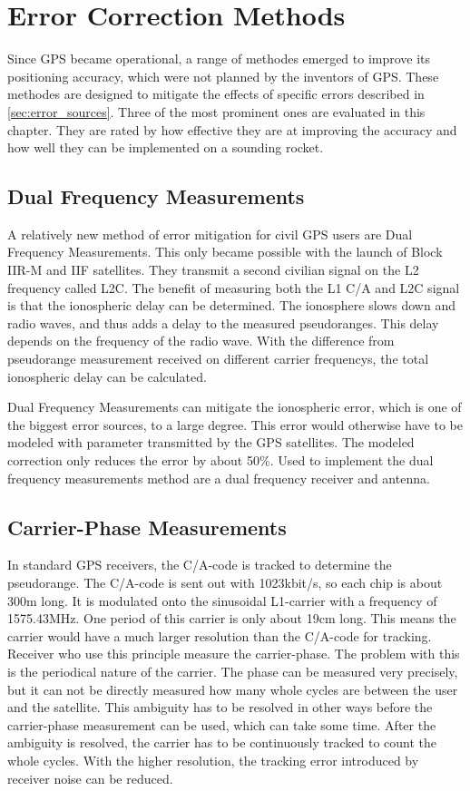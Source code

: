 \chapter{Error Correction Methods}

Since GPS became operational, a range of methodes emerged to improve its positioning accuracy, which were not planned by the inventors of GPS.
These methodes are designed to mitigate the effects of specific errors described in \ref{sec:error_sources}.
Three of the most prominent ones are evaluated in this chapter.
They are rated by how effective they are at improving the accuracy and how well they can be implemented on a sounding rocket.


\section{Dual Frequency Measurements}

A relatively new method of error mitigation for civil GPS users are Dual Frequency Measurements.
This only became possible with the launch of Block IIR-M and IIF satellites.
They transmit a second civilian signal on the L2 frequency called L2C.
The benefit of measuring both the L1 C/A and L2C signal is that the ionospheric delay can be determined.
The ionosphere slows down and radio waves, and thus adds a delay to the measured pseudoranges.
This delay depends on the frequency of the radio wave.
With the difference from pseudorange measurement received on different carrier frequencys, the total ionospheric delay can be calculated.

Dual Frequency Measurements can mitigate the ionospheric error, which is one of the biggest error sources, to a large degree.
This error would otherwise have to be modeled with parameter transmitted by the GPS satellites.
The modeled correction only reduces the error by about 50\%.
Used to implement the dual frequency measurements method are a dual frequency receiver and antenna.
\cite{L1_L2}

\section{Carrier-Phase Measurements}

In standard GPS receivers, the C/A-code is tracked to determine the pseudorange.
The C/A-code is sent out with 1023kbit/s, so each chip is about 300m long.
It is modulated onto the sinusoidal L1-carrier with a frequency of 1575.43MHz.
One period of this carrier is only about 19cm long.
This means the carrier would have a much larger resolution than the C/A-code for tracking.
Receiver who use this principle measure the carrier-phase.
The problem with this is the periodical nature of the carrier.
The phase can be measured very precisely, but it can not be directly measured how many whole cycles are between the user and the satellite.
This ambiguity has to be resolved in other ways before the carrier-phase measurement can be used, which can take some time.
After the ambiguity is resolved, the carrier has to be continuously tracked to count the whole cycles.
With the higher resolution, the tracking error introduced by receiver noise can be reduced.

